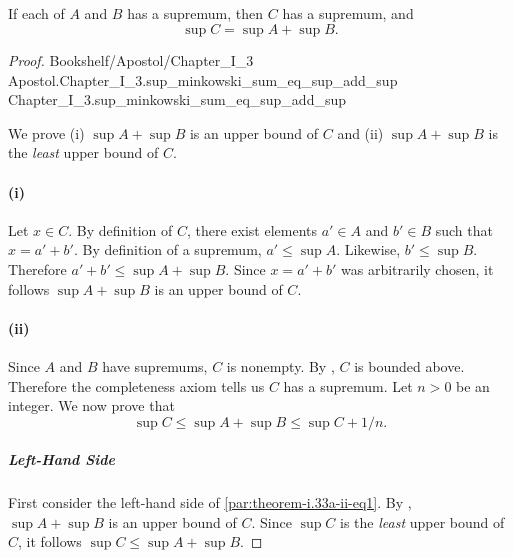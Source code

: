 \documentclass{article}
\newcommand{\link}[1]{\lean{../..}
  {Bookshelf/Apostol/Chapter\_I\_3}
  {Apostol.Chapter\_I\_3.#1}
  {Chapter\_I\_3.#1}
}
\begin{document}
\subsection*{}%
%

If each of $A$ and $B$ has a supremum, then $C$ has a supremum, and
  $$\sup{C} = \sup{A} + \sup{B}.$$

\begin{proof}

  \link{sup\_minkowski\_sum\_eq\_sup\_add\_sup}

  \divider

  We prove (i) $\sup{A} + \sup{B}$ is an upper bound of $C$ and (ii)
    $\sup{A} + \sup{B}$ is the \textit{least} upper bound of $C$.

  \paragraph{(i)}%

    Let $x \in C$.
    By definition of $C$, there exist elements $a' \in A$ and $b' \in B$ such
      that $x = a' + b'$.
    By definition of a supremum, $a' \leq \sup{A}$.
    Likewise, $b' \leq \sup{B}$.
    Therefore $a' + b' \leq \sup{A} + \sup{B}$.
    Since $x = a' + b'$ was arbitrarily chosen, it follows $\sup{A} + \sup{B}$
      is an upper bound of $C$.

  \paragraph{(ii)}%

    Since $A$ and $B$ have supremums, $C$ is nonempty.
    By , $C$ is bounded above.
    Therefore the completeness axiom tells us $C$ has a supremum.
    Let $n > 0$ be an integer.
    We now prove that
      \begin{equation}
        \label{par:theorem-i.33a-ii-eq1}
        \sup{C} \leq \sup{A} + \sup{B} \leq \sup{C} + 1 / n.
      \end{equation}

    \subparagraph{Left-Hand Side}%

      First consider the left-hand side of \eqref{par:theorem-i.33a-ii-eq1}.
      By , $\sup{A} + \sup{B}$ is an upper bound of
        $C$.
      Since $\sup{C}$ is the \textit{least} upper bound of $C$, it follows
        $\sup{C} \leq \sup{A} + \sup{B}$.


\end{proof}
\end{document}
